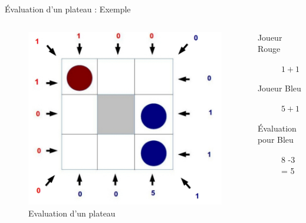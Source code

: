 \documentclass{beamer}
\begin{document}
\begin{frame}{Évaluation d'un plateau : Exemple}
    \begin{columns}
        \begin{column}[l]{0.5\textwidth}
            \begin{figure}
                \includegraphics[width=1.1\textwidth]{./pix/evaluation}
                \centering
                \caption{Evaluation d'un plateau}
            \end{figure}
        \end{column}
        
        \begin{column}[r]{0.5\textwidth}
            \begin{description}
                \item[Joueur Rouge] $1 + 1 + 1 = 3$
                \item[Joueur Bleu] $5 + 1 + 1 + 1 = 8$
                \item[Évaluation pour Bleu] 8 -3 = 5
            \end{description}
        \end{column}

  \end{columns}
\end{frame}
\end{document}
